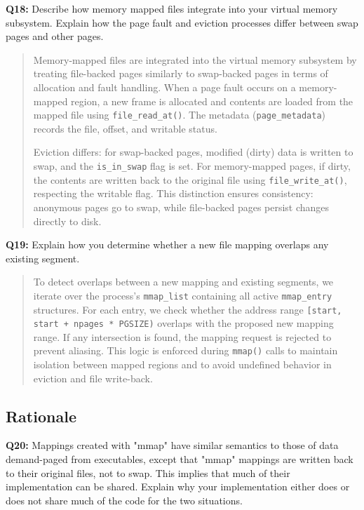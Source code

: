 \documentclass[a4paper,11pt]{paper}
\begin{document}
\textbf{Q18:} Describe how memory mapped files integrate into your virtual memory subsystem.  Explain how the page fault and eviction processes differ between swap pages and other pages.
\begin{quote}
Memory-mapped files are integrated into the virtual memory subsystem by treating file-backed pages similarly to swap-backed pages in terms of allocation and fault handling. When a page fault occurs on a memory-mapped region, a new frame is allocated and contents are loaded from the mapped file using \texttt{file\_read\_at()}. The metadata (\texttt{page\_metadata}) records the file, offset, and writable status.

Eviction differs: for swap-backed pages, modified (dirty) data is written to swap, and the \texttt{is\_in\_swap} flag is set. For memory-mapped pages, if dirty, the contents are written back to the original file using \texttt{file\_write\_at()}, respecting the writable flag. This distinction ensures consistency: anonymous pages go to swap, while file-backed pages persist changes directly to disk.
\end{quote}

\textbf{Q19:} Explain how you determine whether a new file mapping overlaps any existing segment.
\begin{quote}
To detect overlaps between a new mapping and existing segments, we iterate over the process's \texttt{mmap\_list} containing all active \texttt{mmap\_entry} structures. For each entry, we check whether the address range \texttt{[start, start + npages * PGSIZE)} overlaps with the proposed new mapping range. If any intersection is found, the mapping request is rejected to prevent aliasing. This logic is enforced during \texttt{mmap()} calls to maintain isolation between mapped regions and to avoid undefined behavior in eviction and file write-back.
\end{quote}


\subsection{Rationale}
\textbf{Q20:} Mappings created with "mmap" have similar semantics to those of data demand-paged from executables, except that "mmap" mappings are written back to their original files, not to swap.  This implies that much of their implementation can be shared.  Explain why your implementation either does or does not share much of the code for the two situations.
\end{document}
